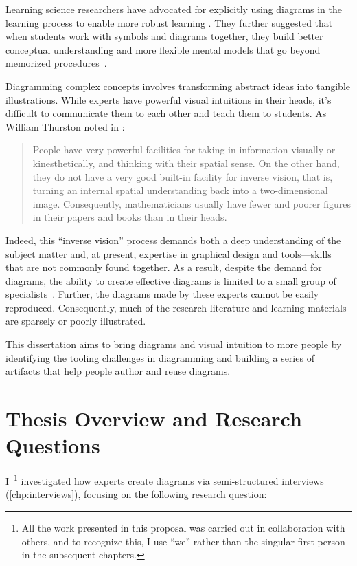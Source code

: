 Learning science researchers have advocated for explicitly using diagrams in the learning process to enable more robust learning \cite{mayer_multimedia_2002}. They further suggested that when students work with symbols and diagrams together, they build better conceptual understanding and more flexible mental models that go beyond memorized procedures~\cite{multipleReps,kellman_perceptual_2010,groundedFeedback}. 

Diagramming complex concepts involves transforming abstract ideas into tangible illustrations. While experts have powerful visual intuitions in their heads, it's difficult to communicate them to each other and teach them to students. As William Thurston noted in :

\begin{quote}
   People have very powerful facilities for taking in information visually or kinesthetically, and thinking with their spatial sense. On the other hand, they do not have a very good built-in facility for inverse vision, that is, turning an internal spatial understanding back into a two-dimensional image. Consequently, mathematicians usually have fewer and poorer figures in their papers and books than in their heads.~\cite[p. 164]{thurston_proof_1994}
\end{quote}

\noindent
Indeed, this ``inverse vision'' process demands both a deep understanding of the subject matter and, at present, expertise in graphical design and tools---skills that are not commonly found together. As a result, despite the demand for diagrams, the ability to create effective diagrams is limited to a small group of specialists~\cite{coulon_importance_2024}. Further, the diagrams made by these experts cannot be easily reproduced. Consequently, much of the research literature and learning materials are sparsely or poorly illustrated.

This dissertation aims to bring diagrams and visual intuition to more people by identifying the tooling challenges in diagramming and building a series of artifacts that help people author and reuse diagrams.

\section{Thesis Overview and Research Questions}

I~\footnote{All the work presented in this proposal was carried out in collaboration with others, and to recognize this, I use ``we'' rather than the singular first person in the subsequent chapters.} investigated how experts create diagrams via semi-structured interviews (\cref{chp:interviews}), focusing on the following research question:

